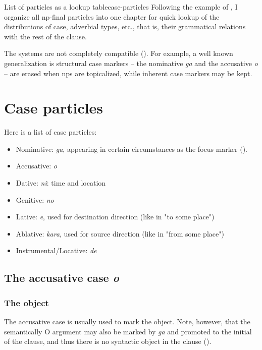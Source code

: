 \documentclass[UTF8, a4paper, oneside, scheme=plain]{ctexrep}
\newcommand{\corpus}[1]{\emph{#1}}
\begin{document}
\begin{theorybox}{List of particles as a lookup table}{case-particles}
    Following the example of \citet{jacques2021grammar},
    I organize all \ac{np}-final particles into one chapter 
    for quick lookup of the distributions of case, adverbial types, etc.,
    that is, their grammatical relations with the rest of the clause.
\end{theorybox}

The systems are not completely compatible ().
For example, a well known generalization is structural case markers 
-- the nominative \corpus{ga} and the accusative \corpus{o} -- 
are erased when \ac{np}s are topicalized,
while inherent case markers may be kept.

\section{Case particles}\label{sec:case-particle}

Here is a list of case particles:
\begin{itemize}
    \item Nominative: \corpus{ga}, 
    appearing in certain circumstances as the focus marker ().
    \item Accusative: \corpus{o}
    \item Dative: \corpus{ni}: time and location 
    \item Genitive: \corpus{no} 
    \item Lative: \corpus{e}, used for destination direction (like in "to some place")
    \item Ablative: \corpus{kara}, used for source direction (like in "from some place")
    \item Instrumental/Locative: \corpus{de}
\end{itemize}

\subsection{The accusative case \corpus{o}}

\subsubsection{The object}

The accusative case is usually used to mark the object.
Note, however, that the semantically O argument may also be marked by \corpus{ga} 
and promoted to the initial of the clause, 
and thus there is no syntactic object in the clause 
().
\end{document}
